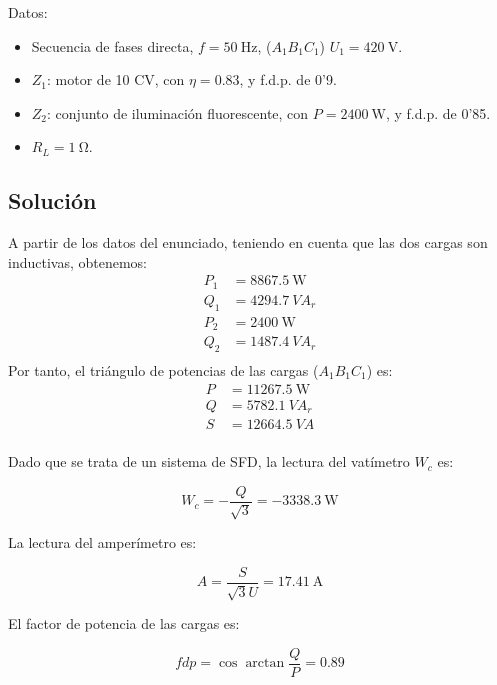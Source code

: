 Datos:
\begin{itemize}
\item Secuencia de fases directa, $f = \SI{50}{\hertz}$, ($A_1B_1C_1$)
  $U_1 = \SI{420}{\volt}$.
\item $Z_1$: motor de 10 CV, con $\eta = 0.83$, y f.d.p. de 0'9.
\item $Z_2$: conjunto de iluminación fluorescente, con
  $P = \SI{2400}{\watt}$, y f.d.p. de 0'85.
\item $R_L = \SI{1}{\ohm}$.
\end{itemize}

\subsection*{Solución}

A partir de los datos del enunciado, teniendo en cuenta que las dos
cargas son inductivas, obtenemos:
\begin{align*}
  P_1 &= \SI{8867.5}{\watt}\\
  Q_1 &= \SI{4294.7}{VA}_r\\
  P_2 &= \SI{2400}{\watt}\\
  Q_2 &= \SI{1487.4}{VA}_r\\
\end{align*}
Por tanto, el triángulo de potencias de las cargas ($A_1B_1C_1$) es:
\begin{align*}
  P &= \SI{11267.5}{\watt}\\
  Q &= \SI{5782.1}{VA}_r\\
  S &= \SI{12664.5}{VA}\\
\end{align*}

Dado que se trata de un sistema de SFD, la lectura del vatímetro $W_c$
es:

\begin{equation*}
  W_c = - \frac{Q}{\sqrt{3}} = \SI{-3338.3}{\watt}
\end{equation*}

La lectura del amperímetro es:

\begin{equation*}
  A = \frac{S}{\sqrt{3} U} = \SI{17.41}{\ampere}
\end{equation*}

El factor de potencia de las cargas es:

\begin{equation*}
  fdp = \cos{\arctan{\frac{Q}{P}}} = 0.89
\end{equation*}


